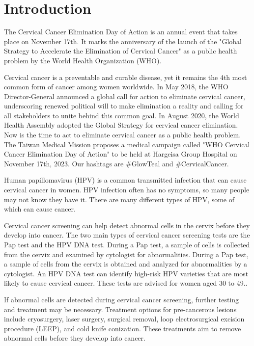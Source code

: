 \documentclass{article}
\begin{document}
\section{Introduction}

The Cervical Cancer Elimination Day of Action is an annual event that takes place on November 17th. It marks the anniversary of the launch of the "Global Strategy to Accelerate the Elimination of Cervical Cancer" as a public health problem by the World Health Organization (WHO).

Cervical cancer is a preventable and curable disease, yet it remains the 4th most common form of cancer among women worldwide. In May 2018, the WHO Director-General announced a global call for action to eliminate cervical cancer\citep{wcced2018}, underscoring renewed political will to make elimination a reality and calling for all stakeholders to unite behind this common goal. In August 2020, the World Health Assembly adopted the Global Strategy for cervical cancer elimination. Now is the time to act to eliminate cervical cancer as a public health problem.
The Taiwan Medical Mission proposes a medical campaign called "WHO Cervical Cancer Elimination Day of Action"\citep{wcced2022} to be held at Hargeisa Group Hospital on November 17th, 2023.
Our hashtags are  \#GlowTeal and \#CervicalCancer.

Human papillomavirus (HPV) is a common transmitted infection that can cause cervical cancer in women. HPV infection often has no symptoms, so many people may not know they have it. There are many different types of HPV, some of which can cause cancer.

Cervical cancer screening can help detect abnormal cells in the cervix before they develop into cancer. The two main types of cervical cancer screening tests are the Pap test and the HPV DNA test. 
During a Pap test, a sample of cells is collected from the cervix and examined by cytologist for abnormalities.
During a Pap test, a sample of cells from the cervix is obtained and analyzed for abnormalities by a cytologist.
An HPV DNA test can identify high-risk HPV varieties that are most likely to cause cervical cancer.
These tests are advised for women aged 30 to 49.\citep{mayo_hpv2023, whocpc2021}.

If abnormal cells are detected during cervical cancer screening, further testing and treatment may be necessary. Treatment options for pre-cancerous lesions include cryosurgery, laser surgery, surgical removal, loop electrosurgical excision procedure (LEEP), and cold knife conization\citep{mayo_cc2023}. These treatments aim to remove abnormal cells before they develop into cancer.
\end{document}
